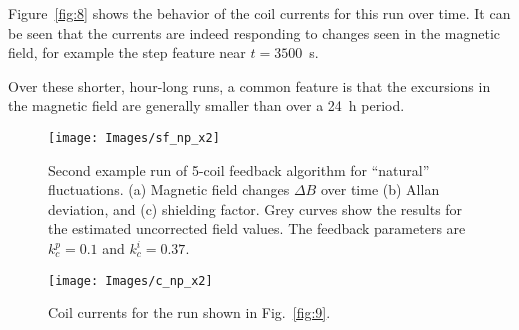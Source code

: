 Figure~\ref{fig:8} shows the behavior of the coil currents for this
run over time.  It can be seen that the currents are indeed responding
to changes seen in the magnetic field, for example the step feature
near $t=3500$~s.

Over these shorter, hour-long runs, a common feature is that the
excursions in the magnetic field are generally smaller than over a
24~h period.

\begin{figure}
\centering
        \texttt{[image: Images/sf\_np\_x2]}
        \caption[Second example run of 5-coil feedback algorithm for ``natural'' fluctuations]{Second example run of 5-coil feedback algorithm for ``natural'' fluctuations.  (a) Magnetic field changes $\Delta B$ over time (b) Allan deviation, and (c) shielding factor.  Grey curves show the results for the estimated uncorrected field values.  The feedback parameters are $k_c^p=0.1$ and $k_c^i=0.37$.}
        \label{fig:9}
        \texttt{[image: Images/c\_np\_x2]}
        \caption{Coil currents for the run shown in Fig.~\ref{fig:9}.}
        \label{fig:10}
\end{figure}





